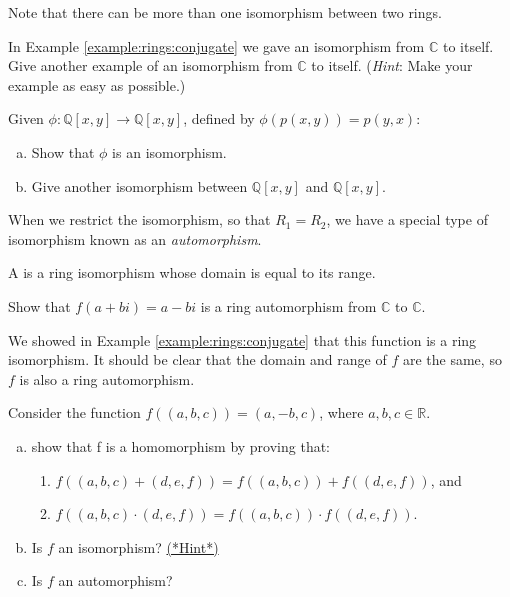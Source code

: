 Note that there can be more than one isomorphism between two rings.

\begin{exercise}
In Example \ref{example:rings:conjugate} we gave an isomorphism from ${\mathbb C}$ to itself.  Give another example of an isomorphism from ${\mathbb C}$ to itself.  (\emph{Hint}:  Make your example as easy as possible.)
\end{exercise}

\begin{exercise}\label{exercise:rings:phi_iso}
Given $\phi:  {\mathbb Q}[x,y]\rightarrow{\mathbb Q}[x,y]$, defined by $\phi(p(x,y))=p(y,x)$:
\begin{enumerate}[(a)]
\item Show that $\phi$ is an isomorphism.
\item Give another isomorphism between ${\mathbb Q}[x,y]$ and ${\mathbb Q}[x,y]$.
\end{enumerate}
\end{exercise}

When we restrict the isomorphism, so that $R_1=R_2$, we have a special type of isomorphism known as an \emph{automorphism}.

\begin{defn}\label{automorphism}
A  is a ring isomorphism whose domain is equal to its range.
\end{defn}

\begin{example}
Show that $f(a+bi)=a-bi$ is a ring automorphism from ${\mathbb C}$ to ${\mathbb C}$.

We showed in Example \ref{example:rings:conjugate} that this function is a ring isomorphism.  It should be clear that the domain and range of $f$ are the same, so $f$ is also a ring automorphism.  
\end{example}

\begin{exercise}\label{exercise:rings:abc_iso}
Consider the function $f((a,b,c))=(a,-b,c)$, where $a,b,c\in{\mathbb R}$.
\begin{enumerate}[(a)]
\item show that f is a homomorphism by proving that:
\begin{enumerate}[(1)]
\item $f((a,b,c)+(d,e,f))=f((a,b,c))+f((d,e,f))$, and 
\item $f((a,b,c)\cdot(d,e,f))=f((a,b,c))\cdot f((d,e,f))$.
\end{enumerate}
\item Is $f$ an isomorphism? \hyperref[ringsHints]{(*Hint*)} 
\item Is $f$ an automorphism?
\end{enumerate}
\end{exercise}

